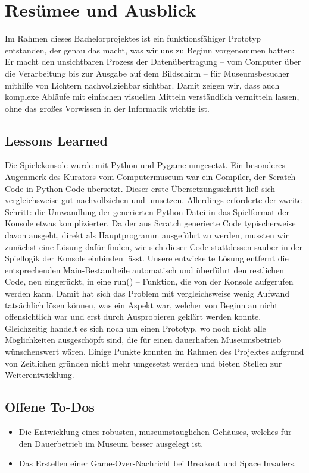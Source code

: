 	

\section{Resümee und Ausblick}
Im Rahmen dieses Bachelorprojektes ist ein funktionsfähiger Prototyp entstanden, der genau das macht, was wir uns zu Beginn vorgenommen hatten: Er macht den unsichtbaren Prozess der Datenübertragung – vom Computer über die Verarbeitung bis zur Ausgabe auf dem Bildschirm – für Museumsbesucher mithilfe von Lichtern nachvollziehbar sichtbar. Damit zeigen wir, dass auch komplexe Abläufe mit einfachen visuellen Mitteln verständlich vermitteln lassen, ohne das großes Vorwissen in der Informatik wichtig ist.

\subsection{Lessons Learned}
Die Spielekonsole wurde mit Python und Pygame umgesetzt. Ein besonderes Augenmerk des Kurators vom Computermuseum war ein Compiler, der Scratch-Code in Python-Code übersetzt. Dieser erste Übersetzungsschritt ließ sich vergleichsweise gut nachvollziehen und umsetzen. Allerdings erforderte der zweite Schritt: die Umwandlung der generierten Python-Datei in das Spielformat der Konsole etwas komplizierter. Da der aus Scratch generierte Code typischerweise davon ausgeht, direkt als Hauptprogramm ausgeführt zu werden, mussten wir zunächst eine Lösung dafür finden, wie sich dieser Code stattdessen sauber in der Spiellogik der Konsole einbinden lässt. Unsere entwickelte Lösung entfernt die entsprechenden Main-Bestandteile automatisch und überführt den restlichen Code, neu eingerückt, in eine run() – Funktion, die von der Konsole aufgerufen werden kann. Damit hat sich das Problem mit vergleichsweise wenig Aufwand tatsächlich lösen können, was ein Aspekt war, welcher von Beginn an nicht offensichtlich war und erst durch Ausprobieren geklärt werden konnte. \\
Gleichzeitig handelt es sich noch um einen Prototyp, wo noch nicht alle Möglichkeiten ausgeschöpft sind, die für einen dauerhaften Museumsbetrieb wünschenswert wären. Einige Punkte konnten im Rahmen des Projektes aufgrund von Zeitlichen gründen nicht mehr umgesetzt werden und bieten Stellen zur Weiterentwicklung.

\subsection{Offene To-Dos}
\begin{itemize}
	\item Die Entwicklung eines robusten, museumstauglichen Gehäuses, welches für den Dauerbetrieb im Museum besser ausgelegt ist.
	\item Das Erstellen einer Game-Over-Nachricht bei Breakout und Space Invaders.
\end{itemize}

